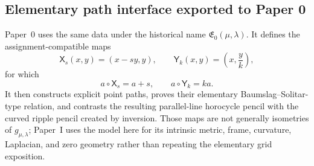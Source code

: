 \subsection{Elementary path interface exported to Paper 0}

Paper~0 uses the same data under the historical name
\(\mathfrak E_0(\mu,\lambda)\).  It defines the assignment-compatible maps
\[
 \mathsf X_s(x,y)=(x-sy,y),
 \qquad
 \mathsf Y_k(x,y)=\left(x,\frac yk\right),
\]
for which
\[
 a\circ\mathsf X_s=a+s,
 \qquad
 a\circ\mathsf Y_k=ka.
\]
It then constructs explicit point paths, proves their elementary
Baumslag--Solitar-type relation, and contrasts the resulting parallel-line
horocycle pencil with the curved ripple pencil created by inversion.  Those
maps are not generally isometries of \(g_{\mu,\lambda}\); Paper~I uses the
model here for its intrinsic metric, frame, curvature, Laplacian, and zero
geometry rather than repeating the elementary grid exposition.
